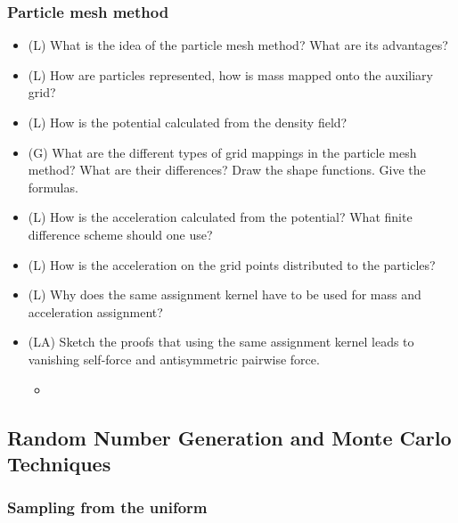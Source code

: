 \subsubsection*{Particle mesh method}
\begin{itemize}
    \item (L) What is the idea of the particle mesh method? What are its advantages?
    \item (L) How are particles represented, how is mass mapped onto the auxiliary grid?
    \item (L) How is the potential calculated from the density field?
    \item (G) What are the different types of grid mappings in the particle mesh method? What are their
    differences? Draw the shape functions. Give the formulas.
    \item (L) How is the acceleration calculated from the potential? What finite difference scheme should one use?
    \item (L) How is the acceleration on the grid points distributed to the particles?
    \item (L) Why does the same assignment kernel have to be used for mass and acceleration assignment?
    \item (LA) Sketch the proofs that using the same assignment kernel leads to vanishing self-force and
    antisymmetric pairwise force.
    \begin{itemize}
        \item {}
    \end{itemize}
\end{itemize}

\subsection*{Random Number Generation and Monte Carlo Techniques}

\subsubsection*{Sampling from the uniform}

